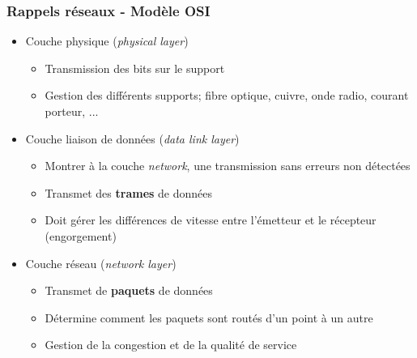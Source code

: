 \begin{frame}[fragile]
  \frametitle{Rappels réseaux - Modèle OSI}
\begin{itemize}
	\item Couche physique (\textit{physical layer})
	\begin{itemize}
		\item Transmission des bits sur le support
		\item Gestion des différents supports; fibre optique, cuivre, onde radio, courant porteur, ...
	\end{itemize}
	\item Couche liaison de données (\textit{data link layer})
	\begin{itemize}
		\item Montrer à la couche \textit{network}, une transmission sans
		erreurs non détectées
		\item Transmet des \textbf{trames} de données
		\item Doit gérer les différences de vitesse entre l'émetteur et le récepteur (engorgement)
	\end{itemize}
	\item Couche réseau (\textit{network layer})
	\begin{itemize}
		\item Transmet de \textbf{paquets} de données
		\item Détermine comment les paquets sont routés d'un point à un autre
		\item Gestion de la congestion et de la qualité de service
	\end{itemize}
\end{itemize}
\end{frame}


